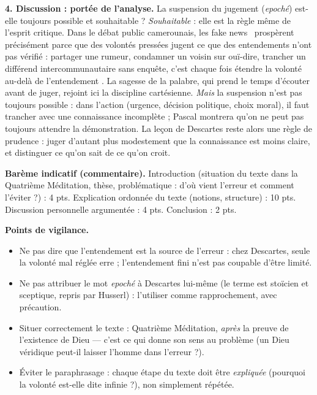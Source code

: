 \documentclass[11pt]{article}
\begin{document}
\begin{corrige}
\textbf{4. Discussion : portée de l'analyse.} La suspension du jugement (\emph{epoché}) est-elle toujours possible et souhaitable ? \emph{Souhaitable} : elle est la règle même de l'esprit critique. Dans le débat public camerounais, les \guillemotleft fake news \guillemotright\ prospèrent précisément parce que des volontés pressées jugent ce que des entendements n'ont pas vérifié : partager une rumeur, condamner un voisin sur ouï-dire, trancher un différend intercommunautaire sans enquête, c'est chaque fois \guillemotleft étendre la volonté au-delà de l'entendement \guillemotright. La sagesse de la palabre, qui prend le temps d'écouter avant de juger, rejoint ici la discipline cartésienne. \emph{Mais} la suspension n'est pas toujours possible : dans l'action (urgence, décision politique, choix moral), il faut trancher avec une connaissance incomplète ; Pascal montrera qu'on ne peut pas toujours attendre la démonstration. La leçon de Descartes reste alors une règle de prudence : juger d'autant plus modestement que la connaissance est moins claire, et distinguer ce qu'on sait de ce qu'on croit.

\textbf{Barème indicatif (commentaire).} Introduction (situation du texte dans la Quatrième Méditation, thèse, problématique : d'où vient l'erreur et comment l'éviter ?) : 4 pts. Explication ordonnée du texte (notions, structure) : 10 pts. Discussion personnelle argumentée : 4 pts. Conclusion : 2 pts.

\textbf{Points de vigilance.}
\begin{itemize}
\item Ne pas dire que l'entendement est la source de l'erreur : chez Descartes, seule la volonté mal réglée erre ; l'entendement fini n'est pas coupable d'être limité.
\item Ne pas attribuer le mot \emph{epoché} à Descartes lui-même (le terme est stoïcien et sceptique, repris par Husserl) : l'utiliser comme rapprochement, avec précaution.
\item Situer correctement le texte : Quatrième Méditation, \emph{après} la preuve de l'existence de Dieu — c'est ce qui donne son sens au problème (un Dieu véridique peut-il laisser l'homme dans l'erreur ?).
\item Éviter le paraphrasage : chaque étape du texte doit être \emph{expliquée} (pourquoi la volonté est-elle dite infinie ?), non simplement répétée.
\end{itemize}
\end{corrige}

\newpage
\end{document}
